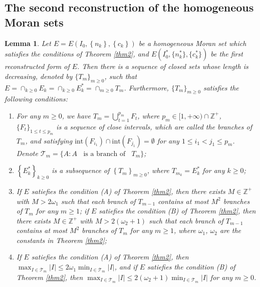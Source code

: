 \documentclass[reqno]{amsart}
\theoremstyle{plain}
\newtheorem{lem}{Lemma}
\theoremstyle{definition}
\theoremstyle{remark}
\numberwithin{equation}{section} \DeclareMathOperator\intr{int}
\begin{document}
\subsection{The second reconstruction of the homogeneous Moran sets}
\begin{lem}\label{l6}
	Let $E=E(I_{0},\left\{n_{k}\right\},\left\{c_{k}\right\})$ be a homogeneous Moran set which satisfies the conditions of Theorem {\rm\ref{thm2}}, and $E(I^*_{0},\{n^*_{k}\},\{c^*_{k}\})$ be the first reconstructed form of $E$. Then there is a sequence of closed sets  whose length is decreasing, denoted by $\{T_{m}\}_{m\ge 0}$, such that $E=\cap_{k\ge0}E_{k}=\cap_{k\ge0}E_{k}^{*}=\cap_{m\ge0}T_{m}$. Furthermore, $\{T_{m}\}_{m\ge 0}$ satisfies the following conditions:
\begin{enumerate}
  \item[\textup{(1)}] For any $m\ge0$, we have $T_{m}=\bigcup_{t=1}^{p_m} F_{t}$, where $p_m \in [1,+\infty)\cap \mathbb{Z}^{+}$,  $\{F_{t}\}_{1\le t\le p_m}$ is a sequence of close intervals, which are called the branches of $T_{m}$, and satisfying $\text{int}(F_{i_1})\cap \text{int}(F_{j_1})=\emptyset$ for any $1\le i_1<j_1\le p_m$. Denote $\mathcal{T}_{m}=\{A: A ~~~~\text{is a branch of}~~~~ T_{m}\}$;
  \item[\textup{(2)}] $\left\{E_{k}^{*}\right\}_{k\ge0}$ is a subsequence of $\left\{T_{m}\right\}_{m\ge 0}$, where $T_{m_{k}}=E_{k}^{*}$ for any $k\ge 0$;

  \item[\textup{(3)}] If $E$ satiefies the condition {\rm(A)} of Theorem {\rm\ref{thm2}}, then there exists $M \in \mathbb{Z}^{+}$ with $M>2\omega_1$ such that each branch of $T_{m-1}$ contains at most $M^{2}$ branches of $T_{m}$ for any $m\ge1$; if $E$ satiefies the condition {\rm(B)} of Theorem {\rm\ref{thm2}}, then there exists $M \in \mathbb{Z}^{+}$ with $M>2(\omega_2+1)$ such that each branch of $T_{m-1}$ contains at most $M^{2}$ branches of $T_{m}$ for any $m\ge1$, where $\omega_1$, $\omega_2$ are the constants in Theorem {\rm\ref{thm2}};
		\item[\textup{(4)}]If $E$ satiefies the condition {\rm(A)} of Theorem {\rm\ref{thm2}}, then $\max_{I\in \mathcal{T}_m}\left | I \right |\le 2 \omega_1\min_{I\in \mathcal{T}_m}\left | I \right |$, and if $E$ satiefies the condition {\rm(B)} of Theorem {\rm\ref{thm2}}, then
$\max_{I\in \mathcal{T}_m}\left | I \right |\le 2 (\omega_2+1)\min_{I\in \mathcal{T}_m}\left | I \right |$ for any $m\ge0$.
\end{enumerate}
\end{lem}
\end{document}
